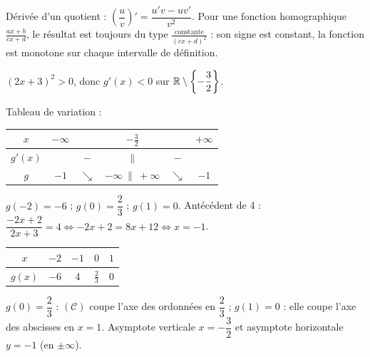 \documentclass[11pt]{article}
\begin{document}
\begin{questions}
\begin{sousq}
\begin{rappel}
Dérivée d'un quotient : $\left(\dfrac{u}{v}\right)' =
\dfrac{u'v - uv'}{v^2}$. Pour une fonction homographique
$\frac{ax+b}{cx+d}$, le résultat est toujours du type
$\frac{\text{constante}}{(cx+d)^2}$ : son signe est constant, la
fonction est monotone sur chaque intervalle de définition.
\end{rappel}
    \item $(2x+3)^2 > 0$, donc $g'(x) < 0$ sur $\mathbb{R}\setminus\left\{-\dfrac{3}{2}\right\}$.
  \end{sousq}
  \item Tableau de variation :
  \begin{center}\renewcommand{\arraystretch}{1.4}
  \begin{tabular}{|c|ccccc|}
  \hline $x$ & $-\infty$ & & $-\frac{3}{2}$ & & $+\infty$ \\\hline
  $g'(x)$ & & $-$ & $\|$ & $-$ & \\\hline
  $g$ & $-1$ & $\searrow$ & $-\infty\ \|\ +\infty$ & $\searrow$ & $-1$ \\\hline
  \end{tabular}
  \end{center}
  \item $g(-2) = -6$ ; $g(0) = \dfrac{2}{3}$ ; $g(1) = 0$. Antécédent de 4 : $\dfrac{-2x+2}{2x+3} = 4 \Leftrightarrow -2x+2 = 8x+12 \Leftrightarrow x = -1$.
  \begin{center}\renewcommand{\arraystretch}{1.4}
  \begin{tabular}{|c|c|c|c|c|}
  \hline $x$ & $-2$ & $-1$ & $0$ & $1$ \\\hline $g(x)$ & $-6$ & $4$ & $\frac{2}{3}$ & $0$ \\\hline
  \end{tabular}
  \end{center}
  \item $g(0) = \dfrac{2}{3}$ : $(\mathcal{C})$ coupe l'axe des ordonnées en $\dfrac{2}{3}$ ; $g(1) = 0$ : elle coupe l'axe des abscisses en $x = 1$. Asymptote verticale $x = -\dfrac{3}{2}$ et asymptote horizontale $y = -1$ (en $\pm\infty$).
  \begin{center}
  \end{center}
\end{questions}
\end{document}
